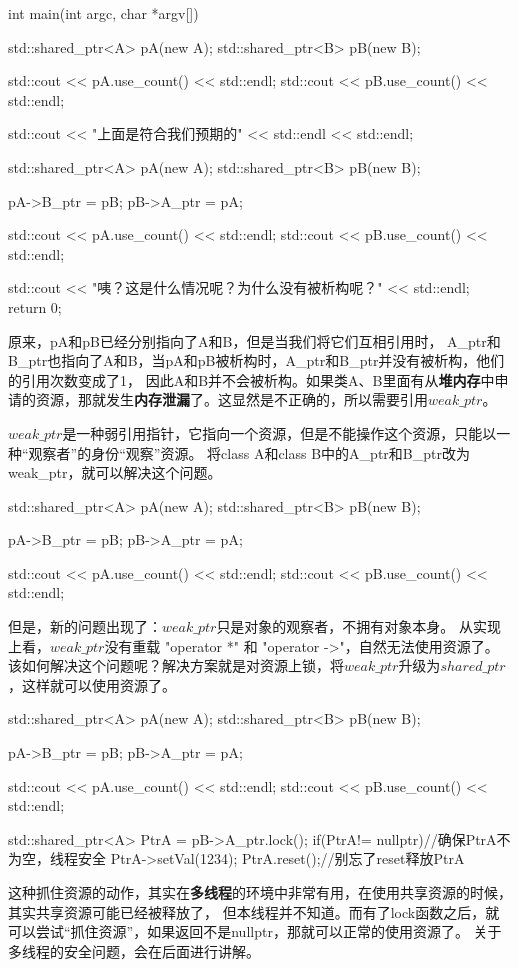 \begin{tcode}
int main(int argc, char *argv[]) {
{
    std::shared_ptr<A> pA(new A);
    std::shared_ptr<B> pB(new B);

    std::cout << pA.use_count() << std::endl;
    std::cout << pB.use_count() << std::endl;
}
std::cout << "上面是符合我们预期的" << std::endl << std::endl;
{
    std::shared_ptr<A> pA(new A);
    std::shared_ptr<B> pB(new B);

    pA->B_ptr = pB;
    pB->A_ptr = pA;

    std::cout << pA.use_count() << std::endl;
    std::cout << pB.use_count() << std::endl;
}
std::cout << "咦？这是什么情况呢？为什么没有被析构呢？" << std::endl;
return 0;
}
\end{tcode}
原来，pA和pB已经分别指向了A和B，但是当我们将它们互相引用时，
A\_ptr和B\_ptr也指向了A和B，当pA和pB被析构时，A\_ptr和B\_ptr并没有被析构，他们的引用次数变成了1，
因此A和B并不会被析构。如果类A、B里面有从\textbf{堆内存}中申请的资源，那就发生\textbf{内存泄漏}了。这显然是不正确的，所以需要引用$weak\_ptr$。

$weak\_ptr$是一种弱引用指针，它指向一个资源，但是不能操作这个资源，只能以一种“观察者”的身份“观察”资源。
将class A和class B中的A\_ptr和B\_ptr改为weak\_ptr，就可以解决这个问题。

\begin{tcode}
{
    std::shared_ptr<A> pA(new A);
    std::shared_ptr<B> pB(new B);

    pA->B_ptr = pB;
    pB->A_ptr = pA;

    std::cout << pA.use_count() << std::endl;
    std::cout << pB.use_count() << std::endl;
}
\end{tcode}
但是，新的问题出现了：$weak\_ptr$只是对象的观察者，不拥有对象本身。
从实现上看，$weak\_ptr$没有重载 "operator *" 和 "operator ->"，自然无法使用资源了。
该如何解决这个问题呢？解决方案就是对资源上锁，将$weak\_ptr$升级为$shared\_ptr$，这样就可以使用资源了。

\begin{tcode}
{
    std::shared_ptr<A> pA(new A);
    std::shared_ptr<B> pB(new B);

    pA->B_ptr = pB;
    pB->A_ptr = pA;

    std::cout << pA.use_count() << std::endl;
    std::cout << pB.use_count() << std::endl;

    std::shared_ptr<A> PtrA = pB->A_ptr.lock();
    if(PtrA!= nullptr)//确保PtrA不为空，线程安全
        PtrA->setVal(1234);
    PtrA.reset();//别忘了reset释放PtrA
}
\end{tcode}
这种抓住资源的动作，其实在\textbf{多线程}的环境中非常有用，在使用共享资源的时候，其实共享资源可能已经被释放了，
但本线程并不知道。而有了lock函数之后，就可以尝试“抓住资源”，如果返回不是nullptr，那就可以正常的使用资源了。
关于多线程的安全问题，会在后面进行讲解。

